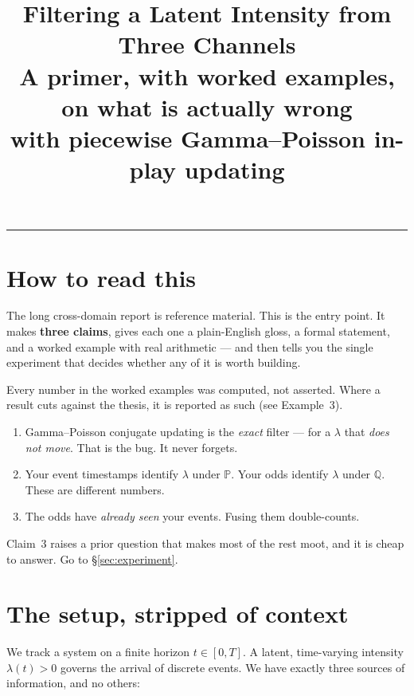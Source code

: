 \documentclass[11pt,a4paper]{article}
\title{\vspace{-1.2cm}\textbf{Filtering a Latent Intensity from Three Channels}\\[4pt]
\large A primer, with worked examples, on what is actually wrong\\ with piecewise Gamma--Poisson in-play updating}
\author{}
\date{}
\theoremstyle{plain}
\begin{document}
\maketitle
\vspace{-1.4cm}

\begin{center}\rule{\textwidth}{0.4pt}\end{center}
\vspace{-0.2cm}

\section*{How to read this}

The long cross-domain report is reference material. This is the entry point. It makes
\textbf{three claims}, gives each one a plain-English gloss, a formal statement, and a
worked example with real arithmetic --- and then tells you the single experiment that
decides whether any of it is worth building.

Every number in the worked examples was computed, not asserted. Where a result cuts
against the thesis, it is reported as such (see Example~3).

\begin{point}[title={THE WHOLE DOCUMENT IN SIX LINES}]
\begin{enumerate}[label=\textbf{\arabic*.}]
\item Gamma--Poisson conjugate updating is the \emph{exact} filter --- for a $\lambda$ that
      \emph{does not move}. That is the bug. It never forgets.
\item Your event timestamps identify $\lambda$ under $\mathbb{P}$. Your odds identify
      $\lambda$ under $\mathbb{Q}$. These are different numbers.
\item The odds have \emph{already seen} your events. Fusing them double-counts.
\end{enumerate}
Claim~3 raises a prior question that makes most of the rest moot, and it is cheap to answer.
Go to \S\ref{sec:experiment}.
\end{point}

\section{The setup, stripped of context}

We track a system on a finite horizon $t\in[0,T]$. A latent, time-varying intensity
$\lambda(t)>0$ governs the arrival of discrete events. We have exactly three sources of
information, and no others:
\end{document}
